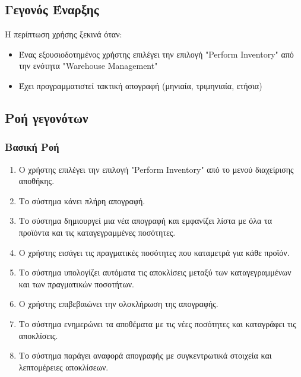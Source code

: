 \documentclass[12pt,a4paper,twoside]{book}
\begin{document}
\subsection{Γεγονός Έναρξης}
Η περίπτωση χρήσης ξεκινά όταν:
\begin{itemize}
  \item Ένας εξουσιοδοτημένος χρήστης επιλέγει την επιλογή "Perform Inventory" από την ενότητα "Warehouse Management" %
  \item Έχει προγραμματιστεί τακτική απογραφή (μηνιαία, τριμηνιαία, ετήσια)
\end{itemize}

\subsection{Ροή γεγονότων}

\subsubsection{Βασική Ροή}
\begin{enumerate}
  \item Ο χρήστης επιλέγει την επιλογή "Perform Inventory" από το μενού διαχείρισης αποθήκης. %
  \item Το σύστημα κάνει πλήρη απογραφή.
  \item Το σύστημα δημιουργεί μια νέα απογραφή και εμφανίζει λίστα με όλα τα προϊόντα και τις καταγεγραμμένες ποσότητες.
  \item Ο χρήστης εισάγει τις πραγματικές ποσότητες που καταμετρά για κάθε προϊόν.
  \item Το σύστημα υπολογίζει αυτόματα τις αποκλίσεις μεταξύ των καταγεγραμμένων και των πραγματικών ποσοτήτων.
  \item Ο χρήστης επιβεβαιώνει την ολοκλήρωση της απογραφής.
  \item Το σύστημα ενημερώνει τα αποθέματα με τις νέες ποσότητες και καταγράφει τις αποκλίσεις.
  \item Το σύστημα παράγει αναφορά απογραφής με συγκεντρωτικά στοιχεία και λεπτομέρειες αποκλίσεων.
\end{enumerate}
\end{document}
